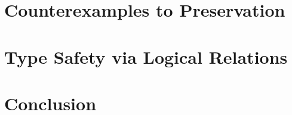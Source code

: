 \documentclass[9pt]{sigplanconf}
\begin{document}
\section{Counterexamples to Preservation}\label{dot-preservation}

\section{Type Safety via Logical Relations}\label{dot-type-safety}

\section{Conclusion}\label{conclusion}




\end{document}
